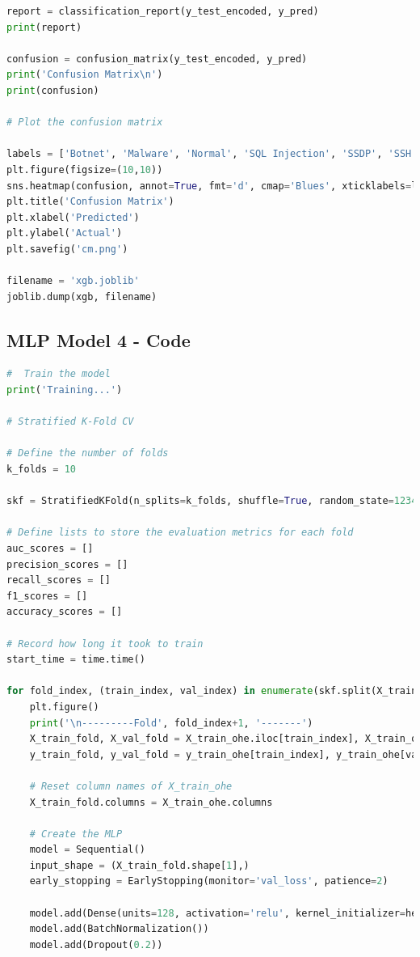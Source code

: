 \begin{appendices}
\begin{lstlisting}[language=Python]
report = classification_report(y_test_encoded, y_pred)
print(report)

confusion = confusion_matrix(y_test_encoded, y_pred)
print('Confusion Matrix\n')
print(confusion)

# Plot the confusion matrix

labels = ['Botnet', 'Malware', 'Normal', 'SQL Injection', 'SSDP', 'SSH', 'Website Spoofing' ]
plt.figure(figsize=(10,10))
sns.heatmap(confusion, annot=True, fmt='d', cmap='Blues', xticklabels=labels, yticklabels=labels)
plt.title('Confusion Matrix')
plt.xlabel('Predicted')
plt.ylabel('Actual')
plt.savefig('cm.png')

filename = 'xgb.joblib'
joblib.dump(xgb, filename)
\end{lstlisting}

\subsection{MLP Model 4 - Code}
\label{appx: MLP Model 4 - Code}
\begin{lstlisting}[language=Python]
#  Train the model
print('Training...')

# Stratified K-Fold CV

# Define the number of folds
k_folds = 10

skf = StratifiedKFold(n_splits=k_folds, shuffle=True, random_state=1234)

# Define lists to store the evaluation metrics for each fold
auc_scores = []
precision_scores = []
recall_scores = []
f1_scores = []
accuracy_scores = []

# Record how long it took to train
start_time = time.time()

for fold_index, (train_index, val_index) in enumerate(skf.split(X_train_ohe, y_train_encoded)):
    plt.figure()
    print('\n---------Fold', fold_index+1, '-------')
    X_train_fold, X_val_fold = X_train_ohe.iloc[train_index], X_train_ohe.iloc[val_index]
    y_train_fold, y_val_fold = y_train_ohe[train_index], y_train_ohe[val_index]
    
    # Reset column names of X_train_ohe
    X_train_fold.columns = X_train_ohe.columns
    
    # Create the MLP
    model = Sequential()
    input_shape = (X_train_fold.shape[1],)
    early_stopping = EarlyStopping(monitor='val_loss', patience=2)

    model.add(Dense(units=128, activation='relu', kernel_initializer=he_uniform(), input_shape=input_shape))
    model.add(BatchNormalization())
    model.add(Dropout(0.2))
    

\end{lstlisting}
\end{appendices}
